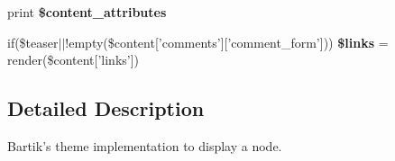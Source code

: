 \begin{DoxyCompactItemize}
\item 
\hypertarget{themes_2bartik_2templates_2node_8tpl_8php_ae2ee2e16f11937564281332a76a658e8}{
print {\bfseries \$content\_\-attributes}}
\label{themes_2bartik_2templates_2node_8tpl_8php_ae2ee2e16f11937564281332a76a658e8}

\item 
\hypertarget{themes_2bartik_2templates_2node_8tpl_8php_aa5bc4787041fe1e4e1cb517e9ec52862}{
if(\$teaser$|$$|$!empty(\$content\mbox{[}'comments'\mbox{]}\mbox{[}'comment\_\-form'\mbox{]})) {\bfseries \$links} = render(\$content\mbox{[}'links'\mbox{]})}
\label{themes_2bartik_2templates_2node_8tpl_8php_aa5bc4787041fe1e4e1cb517e9ec52862}

\end{DoxyCompactItemize}


\subsection{Detailed Description}
Bartik's theme implementation to display a node.

